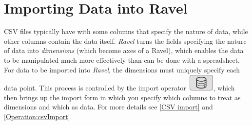 \section{Importing Data into Ravel}

CSV files typically have with some columns that specify the nature
of data, while other columns contain the data itself. \emph{Ravel}
turns the fields specifying the nature of data into \emph{dimensions}
(which become axes of a Ravel), which enables the data to be manipulated
much more effectively than can be done with a spreadsheet. For data
to be imported into \emph{Ravel}, the dimensions must uniquely specify
each data point. This process is controlled by the import operator
\includegraphics{images/ImportWidget}, which then brings up the import
form in which you specify which columns to treat as dimensions and
which as data. For more details see \ref{CSV import} and \ref{Operation:csvImport}.
